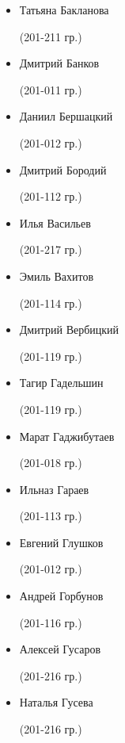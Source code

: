 \begin{multicols}{2}
\begin{small}
\begin{itemize}\itemsep 1pt \parskip 0pt \parsep 0pt
	\item[] Татьяна Бакланова\begin{tiny} (201-211 гр.)\end{tiny}
	\item[] Дмитрий Банков\begin{tiny} (201-011 гр.)\end{tiny}
	\item[] Даниил Бершацкий\begin{tiny} (201-012 гр.)\end{tiny}
	\item[] Дмитрий Бородий\begin{tiny} (201-112 гр.)\end{tiny}
	\item[] Илья Васильев\begin{tiny} (201-217 гр.)\end{tiny}
	\item[] Эмиль Вахитов\begin{tiny} (201-114 гр.)\end{tiny}
	\item[] Дмитрий Вербицкий\begin{tiny} (201-119 гр.)\end{tiny}
	\item[] Тагир Гадельшин\begin{tiny} (201-119 гр.)\end{tiny}
	\item[] Марат Гаджибутаев\begin{tiny} (201-018 гр.)\end{tiny}
	\item[] Ильназ Гараев\begin{tiny} (201-113 гр.)\end{tiny}
	\item[] Евгений Глушков\begin{tiny} (201-012 гр.)\end{tiny}
	\item[] Андрей Горбунов\begin{tiny} (201-116 гр.)\end{tiny}
	\item[] Алексей Гусаров\begin{tiny} (201-216 гр.)\end{tiny}
	\item[] Наталья Гусева\begin{tiny} (201-216 гр.)\end{tiny}

\end{itemize}
\end{small}
\end{multicols}
